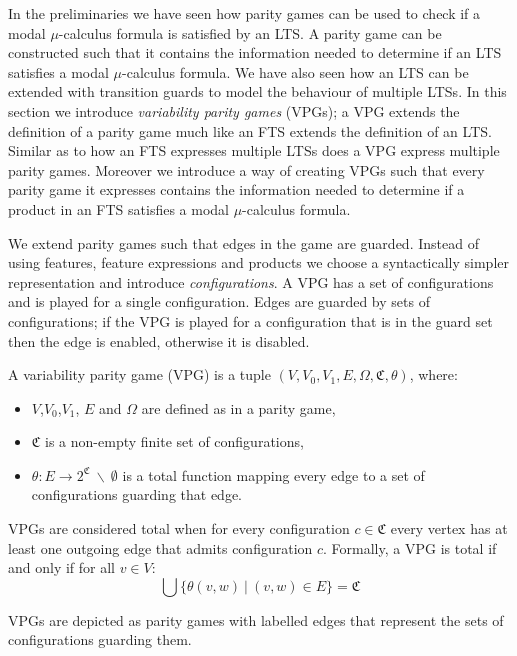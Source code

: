 In the preliminaries we have seen how parity games can be used to check if a modal $\mu$-calculus formula is satisfied by an LTS. A parity game can be constructed such that it contains the information needed to determine if an LTS satisfies a  modal $\mu$-calculus formula. We have also seen how an LTS can be extended with transition guards to model the behaviour of multiple LTSs. In this section we introduce \textit{variability parity games} (VPGs); a VPG extends the definition of a parity game much like an FTS extends the definition of an LTS. Similar as to how an FTS expresses multiple LTSs does a VPG express multiple parity games. Moreover we introduce a way of creating VPGs such that every parity game it expresses contains the information needed to determine if a product in an FTS satisfies a modal $\mu$-calculus formula.

We extend parity games such that edges in the game are guarded. Instead of using features, feature expressions and products we choose a syntactically simpler representation and introduce \textit{configurations}. A VPG has a set of configurations and is played for a single configuration. Edges are guarded by sets of configurations; if the VPG is played for a configuration that is in the guard set then the edge is enabled, otherwise it is disabled.

\begin{definition}
	\label{def_VPG}
	A variability parity game (VPG) is a tuple $(V,V_0, V_1, E, \Omega, \mathfrak{C}, \theta)$, where:
	\begin{itemize}
		\item $V$,$V_0$,$V_1$, $E$ and $\Omega$ are defined as in a parity game,
		\item $\mathfrak{C}$ is a non-empty finite set of configurations,
		\item $\theta : E \rightarrow 2^\mathfrak{C}\ \backslash\ \emptyset$ is a total function mapping every edge to a set of configurations guarding that edge.
	\end{itemize}
\end{definition}
VPGs are considered total when for every configuration $c \in \mathfrak{C}$ every vertex has at least one outgoing edge that admits configuration $c$. Formally, a VPG is total if and only if for all $v \in V$:
\[ \bigcup\{\theta(v,w)\ |\ (v,w) \in E\} = \mathfrak{C} \]

VPGs are depicted as parity games with labelled edges that represent the sets of configurations guarding them.

